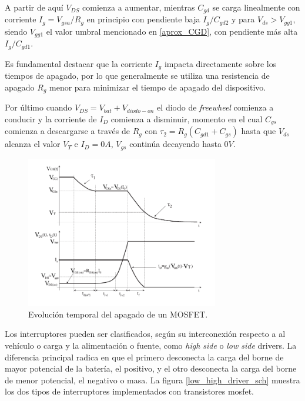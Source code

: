 \documentclass[10pt,a4paper]{article}
\begin{document}
A partir de aquí $V_{DS}$ comienza a aumentar, mientras $C_{gd}$ se carga
linealmente con corriente $I_g=V_{gsa}/R_g$ en principio con pendiente baja
$I_g/C_{gd2}$ y para $V_{ds} > V_{gg1}$, siendo $V_{gg1}$ el valor umbral
mencionado en \ref{aprox_CGD}, con pendiente más alta $I_g/C_{gd1}$.

Es fundamental destacar que la corriente $I_g$ impacta directamente sobre los
tiempos de apagado, por lo que generalmente se utiliza una resistencia de
apagado $R_g$ menor para minimizar el tiempo de apagado del dispositivo.

Por último cuando $V_{DS} = V_{bat} + V_{diodo-on} $ el diodo de
\emph{freewheel} comienza a conducir y la corriente de $I_D$ comienza a
disminuir, momento en el cual $C_{gs}$ comienza a descargarse a través de $R_g$
con $\tau_2 = R_g (C_{gd1}+C_{gs})$ hasta que $V_{ds}$ alcanza el valor $V_T$ e
$I_D = 0A$, $V_{gs}$ continúa decayendo hasta $0V$.\\

\begin{figure}[h!]
	\begin{center}
		\includegraphics[width=0.75\textwidth]{shutdown_time.pdf}
		\caption{Evolución temporal del apagado de un MOSFET.}
		\label{apagado_time}
	\end{center}
\end{figure}
\FloatBarrier

Los interruptores pueden ser clasificados, según su interconexión respecto a al
vehículo o carga y la alimentación o fuente, como \emph{high side} o \emph{low
side} drivers. La diferencia principal radica en que el primero desconecta la
carga del borne de mayor potencial de la batería, el positivo, y el otro
desconecta la carga del borne de menor potencial, el negativo o masa. La figura
\ref{low_high_driver_sch} muestra los dos tipos de interruptores implementados
con transistores mosfet.
\end{document}
